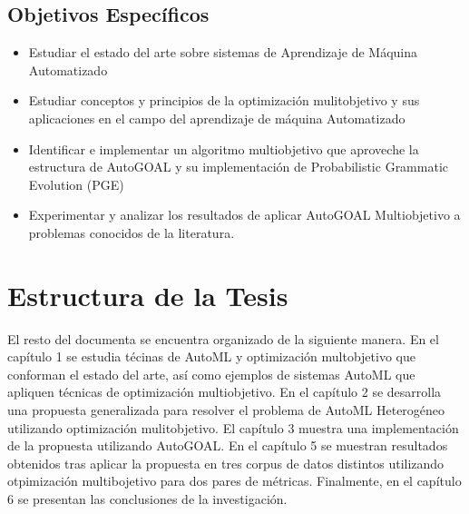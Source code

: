 \subsection*{Objetivos Espec\'ificos}
\begin{itemize}
    \item Estudiar el estado del arte sobre sistemas de Aprendizaje de M\'aquina Automatizado
    \item Estudiar conceptos y principios de la optimizaci\'on mulitobjetivo y sus aplicaciones en el campo del aprendizaje de m\'aquina Automatizado
    \item Identificar e implementar un algoritmo multiobjetivo que aproveche la estructura de AutoGOAL y su implementaci\'on de Probabilistic Grammatic Evolution (PGE)
    \item Experimentar y analizar los resultados de aplicar AutoGOAL Multiobjetivo a problemas conocidos de la literatura.
\end{itemize}

\section*{Estructura de la Tesis}
El resto del documenta se encuentra organizado de la siguiente manera. En el cap\'itulo 1 se estudia t\'ecinas de AutoML y optimizaci\'on multobjetivo que conforman el estado del arte, as\'i como ejemplos de sistemas AutoML que apliquen t\'ecnicas de optimizaci\'on multiobjetivo. En el cap\'itulo 2 se desarrolla una propuesta generalizada para resolver el problema de AutoML Heterog\'eneo utilizando optimizaci\'on mulitobjetivo. El cap\'itulo 3 muestra una implementaci\'on de la propuesta utilizando AutoGOAL. En el cap\'itulo 5 se muestran resultados obtenidos tras aplicar la propuesta en tres corpus de datos distintos utilizando otpimizaci\'on multibojetivo para dos pares de m\'etricas. Finalmente, en el cap\'itulo 6 se presentan las conclusiones de la investigaci\'on.
